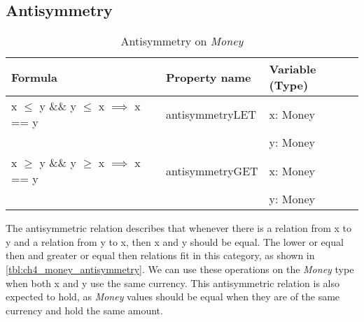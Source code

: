 \subsection*{Antisymmetry}
\begin{table}[h!]
\centering
\begin{tabular}{|lll|}
\hline
                        \textbf{Formula}                             & \textbf{Property name} & \textbf{Variable (Type)} \\ \hline
\rowcolor[HTML]{EFEFEF} x $\leq$ y \&\& y $\leq$ x $\implies$ x == y & antisymmetryLET        & x: Money                 \\
\rowcolor[HTML]{EFEFEF}                                              &                        & y: Money                 \\
                        x $\geq$ y \&\& y $\geq$ x $\implies$ x == y & antisymmetryGET        & x: Money                 \\
                                                                     &                        & y: Money                 \\ \hline
\end{tabular}
\caption{Antisymmetry on \textit{Money}}
\label{tbl:ch4_money_antisymmetry}
\end{table}
The antisymmetric relation describes that whenever there is a relation from x to y and a relation from y to x, then x and y should be equal. The lower or equal then and greater or equal then relations fit in this category, as shown in \autoref{tbl:ch4_money_antisymmetry}. We can use these operations on the \textit{Money} type when both x and y use the same currency. This antisymmetric relation is also expected to hold, as \textit{Money} values should be equal when they are of the same currency and hold the same amount.

